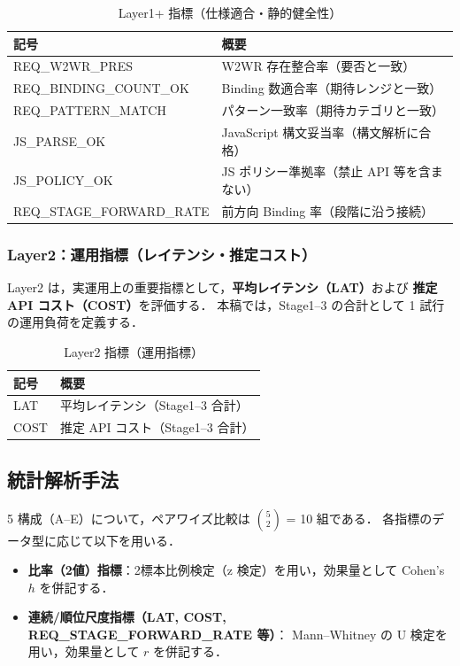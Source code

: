 \documentclass[a4paper,10pt]{jarticle}
\begin{document}
\begin{table}[!t]
\centering
\caption{Layer1+ 指標（仕様適合・静的健全性）}
\label{tab:metrics_layer1plus}
\small
\begin{tabular}{ll} \toprule
記号 & 概要 \\ \midrule
REQ\_W2WR\_PRES & W2WR 存在整合率（要否と一致）\\
REQ\_BINDING\_COUNT\_OK & Binding 数適合率（期待レンジと一致）\\
REQ\_PATTERN\_MATCH & パターン一致率（期待カテゴリと一致）\\
JS\_PARSE\_OK & JavaScript 構文妥当率（構文解析に合格）\\
JS\_POLICY\_OK & JS ポリシー準拠率（禁止 API 等を含まない）\\
REQ\_STAGE\_FORWARD\_RATE & 前方向 Binding 率（段階に沿う接続）\\
\bottomrule
\end{tabular}
\end{table}

\subsubsection{Layer2：運用指標（レイテンシ・推定コスト）}
Layer2 は，実運用上の重要指標として，\textbf{平均レイテンシ（LAT）}および \textbf{推定 API コスト（COST）}を評価する．
本稿では，Stage1--3 の合計として 1 試行の運用負荷を定義する．

\begin{table}[!t]
\centering
\caption{Layer2 指標（運用指標）}
\label{tab:metrics_layer2}
\small
\begin{tabular}{ll} \toprule
記号 & 概要 \\ \midrule
LAT & 平均レイテンシ（Stage1--3 合計）\\
COST & 推定 API コスト（Stage1--3 合計）\\
\bottomrule
\end{tabular}
\end{table}

\subsection{統計解析手法}
5 構成（A--E）について，ペアワイズ比較は $5 \choose 2$ = 10 組である．
各指標のデータ型に応じて以下を用いる．

\begin{itemize}
  \item \textbf{比率（2値）指標}：2標本比例検定（z 検定）を用い，効果量として Cohen's $h$ を併記する．
  \item \textbf{連続/順位尺度指標（LAT, COST, REQ\_STAGE\_FORWARD\_RATE 等）}：
        Mann--Whitney の U 検定を用い，効果量として $r$ を併記する．
\end{itemize}
\end{document}
